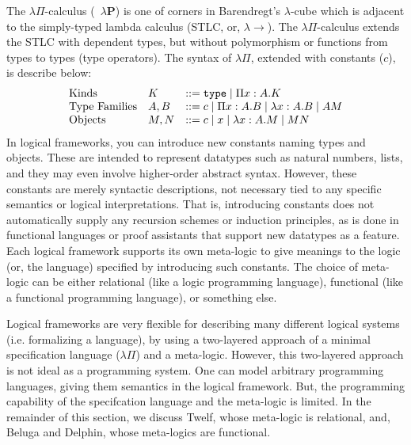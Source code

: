 The $\lambda\Pi$-calculus (\aka\ $\lambda\mathbf{P}$) is one of
corners in Barendregt's $\lambda$-cube \cite{Barendregt91} which is
adjacent to the simply-typed lambda calculus (STLC, or, $\lambda\!\!\rightarrow$).
The $\lambda\Pi$-calculus extends the STLC with dependent types,
but without polymorphism or functions from types to types (type operators).
The syntax of $\lambda\Pi$, extended with constants ($c$), is describe below:
\[
\begin{array}{lll}
\text{Kinds}         & K   & ::= \texttt{type} \mid \Pi x:A.K
        \\
\text{Type Families} & A,B & ::= c \mid \Pi x:A.B \mid \lambda x:A.B \mid AM
        \\
\text{Objects}       & M,N & ::= c \mid x \mid \lambda x:A.M \mid MN
\end{array}
\]
In logical frameworks, you can introduce new constants naming types and objects.
These are intended to represent datatypes such as natural numbers, lists, and
they may even involve higher-order abstract syntax. However, these constants
are merely syntactic descriptions, not necessary tied to any specific 
semantics or logical interpretations. That is, introducing constants
does not automatically supply any recursion schemes or
induction principles, as is done in functional languages or proof assistants
that support new datatypes as a feature. Each logical framework
supports its own meta-logic to give meanings to the logic (or, the language)
specified by introducing such constants. The choice of meta-logic can be either
relational (like a logic programming language),
functional (like a functional programming language), or something else.

Logical frameworks are very flexible for describing many
different logical systems (i.e. formalizing a language),
by using a two-layered approach of a minimal specification language ($\lambda\Pi$)
and a meta-logic. However, this two-layered approach is not ideal
as a programming system. One can model arbitrary
programming languages, giving them semantics
in the logical framework. But, the programming capability of the 
specifcation language and the meta-logic is limited.
In the remainder of this section, we discuss Twelf, whose meta-logic
is relational, and, Beluga and Delphin, whose meta-logics are functional.

